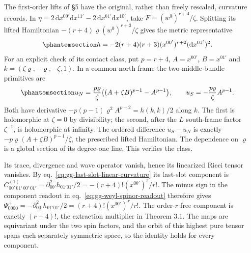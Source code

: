\documentclass[
  english,
  11pt,
  reqno]{amsart}
\begin{document}
The first-order lifts of §5 have the original, rather than freely
rescaled, curvature records. In
\(\eta=2\,\mathrm dx^{00'}\mathrm dx^{11'}-
2\,\mathrm dx^{01'}\mathrm dx^{10'}\), take \(F=(w^0)^{r+4}/\zeta\).
Splitting its lifted Hamiltonian \(-(r+4)\varrho(w^0)^{r+3}/\zeta\)
gives the metric representative
\begin{equation}\protect\phantomsection\label{eq:gg-contact-positive-normalization}{
 h=-2(r+4)(r+3)(x^{00'})^{r+2}(\mathrm dx^{01'})^2 .
}\end{equation} For an explicit check of its contact class, put
\(p=r+4\), \(A=x^{00'}\), \(B=x^{01'}\) and
\(k=(\zeta\varrho,-\varrho,-\zeta,1)\). In a common north frame the two
middle-bundle primitives are
\begin{equation}\protect\phantomsection\label{eq:gg-contact-highest-vector-primitives}{
 u_N=\frac{p\varrho}{\zeta}
             \bigl((A+\zeta B)^{p-1}-A^{p-1}\bigr),\qquad
 u_S=-\frac{p\varrho}{\zeta}A^{p-1}.
}\end{equation} Both have derivative
\(-\!p(p-1)\varrho^2A^{p-2}=h(k,k)/2\) along \(k\). The first is
holomorphic at \(\zeta=0\) by divisibility; the second, after the \(L\)
south-frame factor \(\zeta^{-1}\), is holomorphic at infinity. The
ordered difference \(u_S-u_N\) is exactly
\(-\!p\varrho(A+\zeta B)^{p-1}/\zeta\), the prescribed lifted
Hamiltonian. The dependence on \(\varrho\) is a global section of its
degree-one line. This verifies the class.

Its trace, divergence and wave operator vanish, hence its linearized
Ricci tensor vanishes. By eq.~\ref{eq:gg-last-slot-linear-curvature} its
last-slot component is
\(C^{(1)}_{00'\,01'\,00'\,01'}=\partial_{00'}^2h_{01'01'}/2=-(r+4)!(x^{00'})^r/r!\).
The minus sign in the component readout in
eq.~\ref{eq:gg-weyl-spinor-readout} therefore gives
\(\Psi^+_{0000}=-\partial_{00'}^2h_{01'01'}/2=(r+4)!(x^{00'})^r/r!\).
The order-\(r\) free component is exactly \((r+4)!\), the extraction
multiplier in Theorem 3.1. The maps are equivariant under the two spin
factors, and the orbit of this highest pure tensor spans each separately
symmetric space, so the identity holds for every component.
\end{document}
